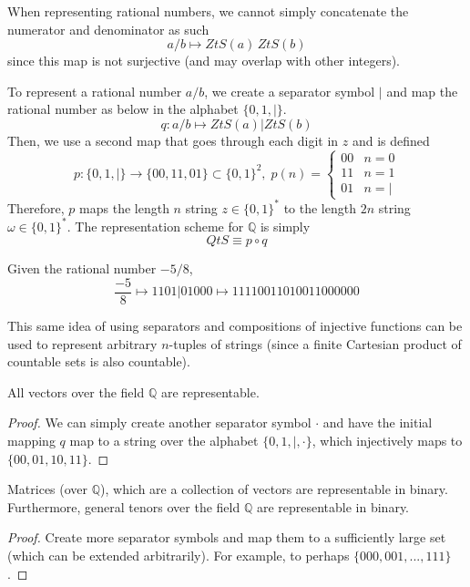 \documentclass{article}
\begin{document}
  When representing rational numbers, we cannot simply concatenate the numerator and denominator as such
  \[a/b \mapsto ZtS(a) \, ZtS(b)\]
  since this map is not surjective (and may overlap with other integers). 

  \begin{definition}
  To represent a rational number $a/b$, we create a separator symbol $|$ and map the rational number as below in the alphabet $\{0, 1, |\}$. 
  \[q: a/b \mapsto ZtS(a) | ZtS(b)\]
  Then, we use a second map that goes through each digit in $z$ and is defined 
  \[p: \{0, 1, |\} \longrightarrow \{00,11,01\} \subset \{0, 1\}^2, \; p(n) = \begin{cases}
  00 & n = 0 \\
  11 & n = 1 \\
  01 & n = |
  \end{cases}\]
  Therefore, $p$ maps the length $n$ string $z \in \{0, 1\}^*$ to the length $2n$ string $\omega \in \{0, 1\}^*$. The representation scheme for $\mathbb{Q}$ is simply 
  \[QtS \equiv p \circ q\]
  \end{definition}

  \begin{example}
  Given the rational number $-5/8$,
  \[\frac{-5}{8} \mapsto 1101|01000 \mapsto 11110011010011000000\]
  \end{example}

  This same idea of using separators and compositions of injective functions can be used to represent arbitrary $n$-tuples of strings (since a finite Cartesian product of countable sets is also countable). 

  \begin{theorem}
  All vectors over the field $\mathbb{Q}$ are representable. 
  \end{theorem}
  \begin{proof}
  We can simply create another separator symbol $\cdot$ and have the initial mapping $q$ map to a string over the alphabet $\{0, 1, |, \cdot\}$, which injectively maps to $\{00, 01, 10, 11\}$. 
  \end{proof}

  \begin{corollary}
  Matrices (over $\mathbb{Q}$), which are a collection of vectors are representable in binary. Furthermore, general tenors over the field $\mathbb{Q}$ are representable in binary. 
  \end{corollary}
  \begin{proof}
  Create more separator symbols and map them to a sufficiently large set (which can be extended arbitrarily). For example, to perhaps $\{000, 001, ..., 111\}$. 
  \end{proof}
\end{document}
